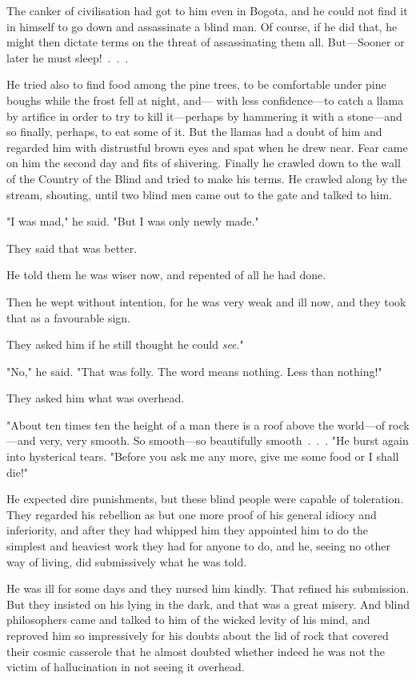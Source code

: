 \documentclass[courier]{sffms}
\begin{document}
The canker of civilisation had got to him even in Bogota, and he could
not find it in himself to go down and assassinate a blind man. Of
course, if he did that, he might then dictate terms on the threat of
assassinating them all. But---Sooner or later he must sleep!~.~.~.

He tried also to find food among the pine trees, to be comfortable
under pine boughs while the frost fell at night, and--- with less
confidence---to catch a llama by artifice in order to try to kill
it---perhaps by hammering it with a stone---and so finally, perhaps, to
eat some of it. But the llamas had a doubt of him and regarded him
with distrustful brown eyes and spat when he drew near.  Fear came on
him the second day and fits of shivering. Finally he crawled down to
the wall of the Country of the Blind and tried to make his terms. He
crawled along by the stream, shouting, until two blind men came out to
the gate and talked to him.

"I was mad," he said. "But I was only newly made."

They said that was better.

He told them he was wiser now, and repented of all he had done.

Then he wept without intention, for he was very weak and ill now, and
they took that as a favourable sign.

They asked him if he still thought he could \emph{see}."

"No," he said. "That was folly. The word means nothing. Less than
nothing!"

They asked him what was overhead.

"About ten times ten the height of a man there is a roof above the
world---of rock---and very, very smooth. So smooth---so beautifully
smooth~.~.~.  "He burst again into hysterical tears. "Before you ask me
any more, give me some food or I shall die!"

He expected dire punishments, but these blind people were capable of
toleration.  They regarded his rebellion as but one more proof of his
general idiocy and inferiority, and after they had whipped him they
appointed him to do the simplest and heaviest work they had for anyone
to do, and he, seeing no other way of living, did submissively what he
was told.

He was ill for some days and they nursed him kindly. That refined his
submission. But they insisted on his lying in the dark, and that was a
great misery. And blind philosophers came and talked to him of the
wicked levity of his mind, and reproved him so impressively for his
doubts about the lid of rock that covered their cosmic casserole that
he almost doubted whether indeed he was not the victim of
hallucination in not seeing it overhead.
\end{document}
